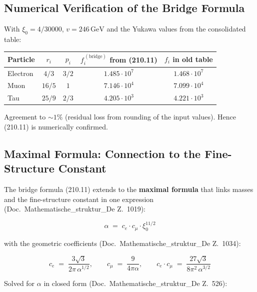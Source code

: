 \subsection*{Numerical Verification of the Bridge Formula}

With $\xi_0 = 4/30000$, $v = 246\,\text{GeV}$ and the Yukawa values
from the consolidated table:

\begin{center}
{\footnotesize
\begin{tabular}{lcccc}
\toprule
\textbf{Particle} & \textbf{$r_i$} & \textbf{$p_i$} &
  \textbf{$f_i^{\,(\text{bridge})}$ from (210.11)} &
  \textbf{$f_i$ in old table} \\
\midrule
Electron & $4/3$  & $3/2$ & $1.485 \cdot 10^7$ & $1.468 \cdot 10^7$ \\
Muon     & $16/5$ & $1$   & $7.146 \cdot 10^4$ & $7.099 \cdot 10^4$ \\
Tau      & $25/9$ & $2/3$ & $4.205 \cdot 10^3$ & $4.221 \cdot 10^3$ \\
\bottomrule
\end{tabular}
}
\end{center}

Agreement to $\sim 1\%$ (residual loss from rounding of the input
values). Hence (210.11) is numerically confirmed.

\subsection*{Maximal Formula: Connection to the Fine-Structure Constant}

The bridge formula (210.11) extends to the \textbf{maximal formula}
that links masses and the fine-structure constant in one expression
(Doc.~Mathematische\_struktur\_De Z.~1019):

\begin{equation}
  \boxed{\;\alpha \;=\; c_e \cdot c_\mu \cdot \xi_0^{11/2}\;}
  \tag{210.12}
\end{equation}

with the geometric coefficients (Doc.~Mathematische\_struktur\_De
Z.~1034):

\begin{equation}
  c_e \;=\; \frac{3\sqrt{3}}{2\pi\,\alpha^{1/2}},
  \qquad
  c_\mu \;=\; \frac{9}{4\pi\alpha},
  \qquad
  c_e \cdot c_\mu \;=\; \frac{27\sqrt{3}}{8\pi^2\,\alpha^{3/2}}
  \tag{210.13}
\end{equation}

Solved for $\alpha$ in closed form
(Doc.~Mathematische\_struktur\_De Z.~526):

